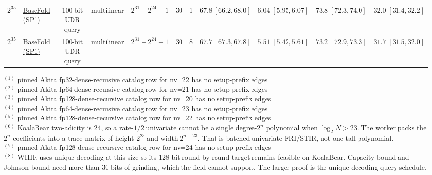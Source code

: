 \begin{table}[H]
\begin{tabular}{@{}llclcccrrrr@{}}
$2^{35}$ & \href{https://github.com/succinctlabs/sp1/commit/0f2a1e1389747ac0dbee1c4d40243eed20baba86}{BaseFold (SP1)} & 100-bit UDR query & multilinear & $2^{31}-2^{24}+1$ & 30 & 1 & $67.8\;[66.2, 68.0]$ & $6.04\;[5.95, 6.07]$ & $73.8\;[72.3, 74.0]$ & $32.0\;[31.4, 32.2]$ \\
$2^{35}$ & \href{https://github.com/succinctlabs/sp1/commit/0f2a1e1389747ac0dbee1c4d40243eed20baba86}{BaseFold (SP1)} & 100-bit UDR query & multilinear & $2^{31}-2^{24}+1$ & 30 & 8 & $67.7\;[67.3, 67.8]$ & $5.51\;[5.42, 5.61]$ & $73.2\;[72.9, 73.3]$ & $31.7\;[31.5, 32.0]$ \\
\bottomrule
\end{tabular}
\smallskip
{\footnotesize
\noindent$^{(1)}$ pinned Akita fp32-dense-recursive catalog row for nv=22 has no setup-prefix edges\\
\noindent$^{(2)}$ pinned Akita fp64-dense-recursive catalog row for nv=21 has no setup-prefix edges\\
\noindent$^{(3)}$ pinned Akita fp128-dense-recursive catalog row for nv=20 has no setup-prefix edges\\
\noindent$^{(4)}$ pinned Akita fp64-dense-recursive catalog row for nv=23 has no setup-prefix edges\\
\noindent$^{(5)}$ pinned Akita fp128-dense-recursive catalog row for nv=22 has no setup-prefix edges\\
\noindent$^{(6)}$ KoalaBear two-adicity is 24, so a rate-$1/2$ univariate cannot be a single degree-$2^{n}$ polynomial when $\log_2 N>23$. The worker packs the $2^{n}$ coefficients into a trace matrix of height $2^{23}$ and width $2^{n-23}$. That is batched univariate FRI/STIR, not one tall polynomial.\\
\noindent$^{(7)}$ pinned Akita fp128-dense-recursive catalog row for nv=24 has no setup-prefix edges\\
\noindent$^{(8)}$ WHIR uses unique decoding at this size so its 128-bit round-by-round target remains feasible on KoalaBear. Capacity bound and Johnson bound need more than 30 bits of grinding, which the field cannot support. The larger proof is the unique-decoding query schedule.\\
}
\end{table}


